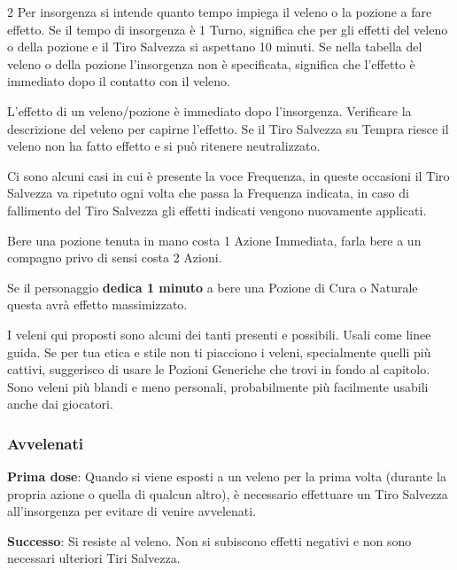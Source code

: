 \begin{multicols}{2}
Per insorgenza si intende quanto tempo impiega il veleno o la pozione a fare effetto. Se il tempo di insorgenza è 1 Turno, significa che per gli effetti del veleno o della pozione e il Tiro Salvezza si aspettano 10 minuti. Se nella tabella del veleno o della pozione l'insorgenza non è specificata, significa che l'effetto è immediato dopo il contatto con il veleno.

L'effetto di un veleno/pozione è immediato dopo l'insorgenza. Verificare la descrizione del veleno per capirne l'effetto. Se il Tiro Salvezza su Tempra riesce il veleno non ha fatto effetto e si può ritenere neutralizzato.

Ci sono alcuni casi in cui è presente la voce Frequenza, in queste occasioni il Tiro Salvezza va ripetuto ogni volta che passa la Frequenza indicata, in caso di fallimento del Tiro Salvezza gli effetti indicati vengono nuovamente applicati.

Bere una pozione tenuta in mano costa 1 Azione Immediata, farla bere a un compagno privo di sensi costa 2 Azioni.

Se il personaggio \textbf{dedica 1 minuto} a bere una Pozione di Cura o Naturale questa avrà effetto massimizzato.


\begin{narratore}
I veleni qui proposti sono alcuni dei tanti presenti e possibili. Usali come linee guida. Se per tua etica e stile non ti piacciono i veleni, specialmente quelli più cattivi, suggerisco di usare le Pozioni Generiche che trovi in fondo al capitolo. Sono veleni più blandi e meno personali, probabilmente più facilmente usabili anche dai giocatori.
\end{narratore}

\subsubsection{Avvelenati}\label{avvelenato}

\textbf{Prima dose}: Quando si viene esposti a un veleno per la prima volta (durante la propria azione o quella di qualcun altro), è necessario effettuare un Tiro Salvezza all'insorgenza per evitare di venire avvelenati.

\textbf{Successo}: Si resiste al veleno. Non si subiscono effetti negativi e non sono necessari ulteriori Tiri Salvezza.


\end{multicols}
